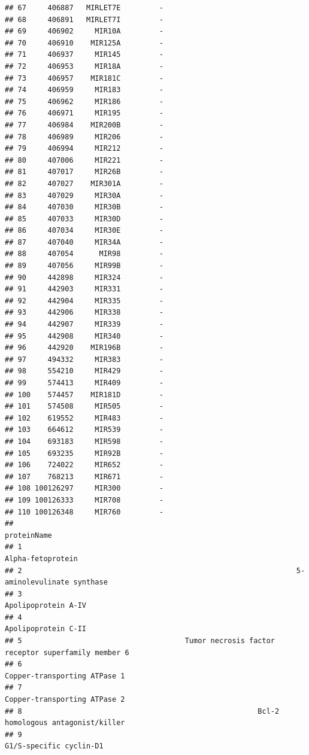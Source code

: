 \documentclass[
]{article}
\begin{document}
\begin{verbatim}
## 67     406887   MIRLET7E         -
## 68     406891   MIRLET7I         -
## 69     406902     MIR10A         -
## 70     406910    MIR125A         -
## 71     406937     MIR145         -
## 72     406953     MIR18A         -
## 73     406957    MIR181C         -
## 74     406959     MIR183         -
## 75     406962     MIR186         -
## 76     406971     MIR195         -
## 77     406984    MIR200B         -
## 78     406989     MIR206         -
## 79     406994     MIR212         -
## 80     407006     MIR221         -
## 81     407017     MIR26B         -
## 82     407027    MIR301A         -
## 83     407029     MIR30A         -
## 84     407030     MIR30B         -
## 85     407033     MIR30D         -
## 86     407034     MIR30E         -
## 87     407040     MIR34A         -
## 88     407054      MIR98         -
## 89     407056     MIR99B         -
## 90     442898     MIR324         -
## 91     442903     MIR331         -
## 92     442904     MIR335         -
## 93     442906     MIR338         -
## 94     442907     MIR339         -
## 95     442908     MIR340         -
## 96     442920    MIR196B         -
## 97     494332     MIR383         -
## 98     554210     MIR429         -
## 99     574413     MIR409         -
## 100    574457    MIR181D         -
## 101    574508     MIR505         -
## 102    619552     MIR483         -
## 103    664612     MIR539         -
## 104    693183     MIR598         -
## 105    693235     MIR92B         -
## 106    724022     MIR652         -
## 107    768213     MIR671         -
## 108 100126297     MIR300         -
## 109 100126333     MIR708         -
## 110 100126348     MIR760         -
##                                                                                 proteinName
## 1                                                                        Alpha-fetoprotein 
## 2                                                                5-aminolevulinate synthase
## 3                                                                      Apolipoprotein A-IV 
## 4                                                                      Apolipoprotein C-II 
## 5                                      Tumor necrosis factor receptor superfamily member 6 
## 6                                                             Copper-transporting ATPase 1 
## 7                                                             Copper-transporting ATPase 2 
## 8                                                       Bcl-2 homologous antagonist/killer 
## 9                                                                  G1/S-specific cyclin-D1 

\end{verbatim}
\end{document}
